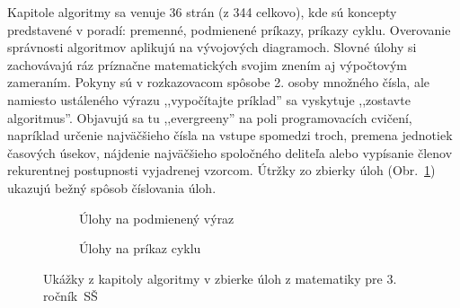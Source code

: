 Kapitole algoritmy sa venuje 36 strán (z 344 celkovo), kde sú koncepty predstavené v poradí: premenné, podmienené príkazy, príkazy cyklu. Overovanie správnosti algoritmov aplikujú na vývojových diagramoch. Slovné úlohy si zachovávajú ráz príznačne matematických svojim znením  aj výpočtovým zameraním. Pokyny sú v rozkazovacom spôsobe 2. osoby množného čísla, ale namiesto ustáleného výrazu ,,vypočítajte príklad'' sa vyskytuje ,,zostavte algoritmus''. Objavujú sa tu ,,evergreeny'' na poli programovacích cvičení, napríklad určenie najväčšieho čísla na vstupe spomedzi troch, premena jednotiek časových úsekov, nájdenie najväčšieho spoločného deliteľa alebo vypísanie členov rekurentnej postupnosti vyjadrenej vzorcom. Útržky zo zbierky úloh (Obr.~\ref{fig:matematika-slovne-ulohy}) ukazujú bežný spôsob číslovania úloh.

\begin{figure}[h]
\centering
\begin{subfigure}[b]{0.48\textwidth}
\centering
{}
\caption{Úlohy na podmienený výraz}
\end{subfigure}
\hfill
\begin{subfigure}[b]{0.48\textwidth}
\centering
{}
\caption{Úlohy na príkaz cyklu}
\end{subfigure}
\caption{Ukážky z kapitoly algoritmy v zbierke úloh z matematiky pre 3. ročník~SŠ}
\label{fig:matematika-slovne-ulohy}
\end{figure}

